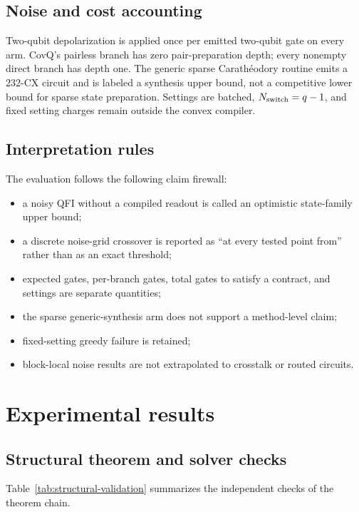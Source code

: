 \documentclass[11pt]{article}
\theoremstyle{definition}
\theoremstyle{remark}
\begin{document}
\subsection{Noise and cost accounting}
Two-qubit depolarization is applied once per emitted two-qubit gate on every arm. CovQ's pairless branch has zero pair-preparation depth; every nonempty direct branch has depth one. The generic sparse Carath\'eodory routine emits a 232-CX circuit and is labeled a synthesis upper bound, not a competitive lower bound for sparse state preparation. Settings are batched, $N_{\rm switch}=q-1$, and fixed setting charges remain outside the convex compiler.

\subsection{Interpretation rules}
The evaluation follows the following claim firewall:
\begin{itemize}
  \item a noisy QFI without a compiled readout is called an optimistic state-family upper bound;
  \item a discrete noise-grid crossover is reported as ``at every tested point from'' rather than as an exact threshold;
  \item expected gates, per-branch gates, total gates to satisfy a contract, and settings are separate quantities;
  \item the sparse generic-synthesis arm does not support a method-level claim;
  \item fixed-setting greedy failure is retained;
  \item block-local noise results are not extrapolated to crosstalk or routed circuits.
\end{itemize}

\section{Experimental results}
\label{sec:results}

\subsection{Structural theorem and solver checks}
Table~\ref{tab:structural-validation} summarizes the independent checks of the theorem chain.
\end{document}
